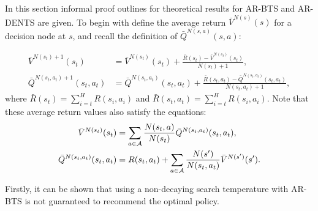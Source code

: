 


        In this section informal proof outlines for theoretical results for AR-BTS and AR-DENTS are given. To begin with define the average return $\bar{V}^{N(s)}(s)$ for a decision node at $s$, and recall the definition of $\bar{Q}^{N(s,a)}(s, a)$:

        \begin{align}
            \bar{V}^{N(s_t)+1}(s_t) &= \bar{V}^{N(s_t)}(s_t) + \frac{\bar{R}(s_t) - \bar{V}^{N(s_t)}(s_t)}{N(s_t) + 1},  \label{appeq:ar_v} \\
            \bar{Q}^{N(s_t,a_t)+1}(s_t, a_t) &= \bar{Q}^{N(s_t,a_t)}(s_t, a_t) 
                + \frac{\bar{R}(s_t,a_t) - \bar{Q}^{N(s_t,a_t)}(s_t, a_t)}{N(s_t, a_t) + 1},  \label{appeq:ar_q}
        \end{align}
        where $\bar{R}(s_t)=\sum_{i=t}^H R(s_i,a_i)$ and $\bar{R}(s_t, a_t)=\sum_{i=t}^H R(s_i,a_i)$. Note that these average return values also satisfy the equations:
        \begin{align}
            \bar{V}^{N(s_t)}(s_t) &= \sum_{a\in\mathcal{A}} \frac{N(s_t,a)}{N(s_t)} \bar{Q}^{N(s_t,a_t)}(s_t, a_t), \label{appeq:ar_v_rel} \\
            \bar{Q}^{N(s_t,a_t)}(s_t, a_t) 
                &= R(s_t,a_t) + \sum_{a\in\mathcal{A}} \frac{N(s')}{N(s_t,a_t)} \bar{V}^{N(s')}(s'). \label{appeq:ar_q_rel}
        \end{align}











        Firstly, it can be shown that using a non-decaying search temperature with AR-BTS is not guaranteed to recommend the optimal policy.
        
